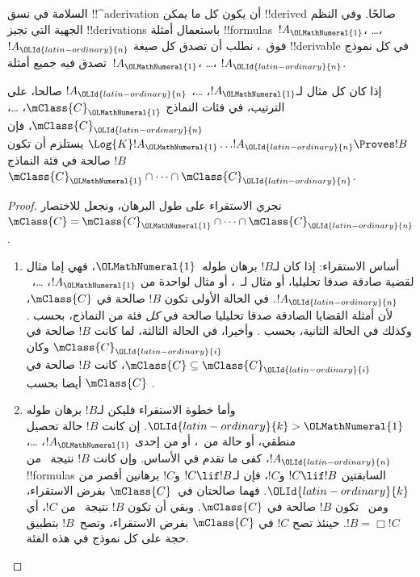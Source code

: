 \documentclass[../../../include/open-logic-section]{subfiles}
\begin{document}


السلامة في نسق !!^a{derivation} أن يكون كل ما يمكن !!{derive}d
صالحًا. وفي النظم الجهية التي تجيز !!{derivation}s باستعمال
أمثلة !!{formula}s~$!A_\OLMathNumeral{1}$، \dots،~$!A_\OLId{latin-ordinary}{n}$ فوق~،
نطلب أن تصدق كل صيغة !!{derivable} في كل نموذج تصدق فيه
جميع أمثلة~$!A_\OLMathNumeral{1}$، \dots، $!A_\OLId{latin-ordinary}{n}$.

\begin{thm}
  إذا كان كل مثال لـ$!A_\OLMathNumeral{1}$، \dots، $!A_\OLId{latin-ordinary}{n}$ صالحا، على الترتيب، في
  فئات النماذج $\mClass{C}_\OLMathNumeral{1}$، \dots، $\mClass{C}_\OLId{latin-ordinary}{n}$، فإن
  $\Log{K}!A_\OLMathNumeral{1}\dots !A_\OLId{latin-ordinary}{n} \Proves !B$ يستلزم أن تكون $!B$ صالحة في
  فئة النماذج $\mClass{C}_\OLMathNumeral{1} \cap \dots \cap \mClass{C}_\OLId{latin-ordinary}{n}$.
\end{thm}

\begin{proof}
  نجري الاستقراء على طول البرهان، ونجعل للاختصار
  $\mClass{C} =
  \mClass{C}_\OLMathNumeral{1} \cap \dots \cap \mClass{C}_\OLId{latin-ordinary}{n}$.
  \begin{enumerate}
  \item أساس الاستقراء: إذا كان لـ$!B$ برهان طوله~$\OLMathNumeral{1}$، فهي إما مثال
    لقضية صادقة صدقا تحليليا، أو مثال لـ~،
     أو مثال لواحدة من $!A_\OLMathNumeral{1}$،
    \dots،~$!A_\OLId{latin-ordinary}{n}$. في الحالة الأولى تكون $!B$ صالحة في
    $\mClass{C}$، لأن أمثلة القضايا الصادقة صدقا تحليليا صالحة في
    \emph{كل} فئة من النماذج، بحسب .
    وكذلك في الحالة الثانية، بحسب
    . وأخيرا، في الحالة الثالثة،
    لما كانت $!B$ صالحة في $\mClass{C}_\OLId{latin-ordinary}{i}$ وكان $\mClass{C} \subseteq
    \mClass{C}_\OLId{latin-ordinary}{i}$، كانت $!B$ صالحة في $\mClass{C}$ أيضا بحسب
    .
  \item وأما خطوة الاستقراء فليكن لـ$!B$ برهان طوله $\OLId{latin-ordinary}{k}>\OLMathNumeral{1}$.
    إن كانت $!B$ حالة تحصيل منطقي، أو حالة من~،
     أو من إحدى
    $!A_\OLMathNumeral{1}$، \dots، $!A_\OLId{latin-ordinary}{n}$، كفى ما تقدم في الأساس.
    وإن كانت $!B$ نتيجة~\MP{} من !!{formula}s السابقتين
    $!C \lif !B$ و$!C$، فإن لـ$!C \lif !B$ و$!C$ برهانين
    أقصر من $\OLId{latin-ordinary}{k}$. فهما صالحتان في~$\mClass{C}$ بفرض الاستقراء،
    ومن~ تكون $!B$ صالحة في
    $\mClass{C}$. وبقي أن تكون $!B$ نتيجة~\Nec{} من $!C$،
    أي $!B = \Box!C$. حينئذ تصح $!C$ في $\mClass{C}$
    بفرض الاستقراء، وتصح~$!B$ بتطبيق حجة
     على كل نموذج في هذه الفئة.
  \end{enumerate}
\end{proof}
\end{document}
